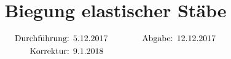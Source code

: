 

\subject{V103}
\title{Biegung elastischer Stäbe}

\date{
  \begin{align}
    \text{Durchführung: } & \text{5.12.2017} & \hspace{3em} & \text{Abgabe: 12.12.2017} \notag
\\  \text{Korrektur: } & \text{9.1.2018} & \hspace {3em} & \notag
  \end{align}
}




\maketitle
\thispagestyle{empty}
\tableofcontents
\newpage







\nocite{*}
\printbibliography{}


